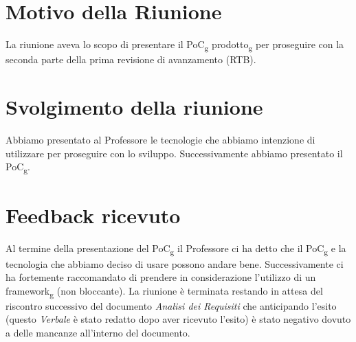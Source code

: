 \section{Motivo della Riunione}
La riunione aveva lo scopo di presentare il PoC\textsubscript{g} prodotto\textsubscript{g} per proseguire con la seconda parte della prima revisione di avanzamento (RTB).
\section{Svolgimento della riunione}
Abbiamo presentato al Professore le tecnologie che abbiamo intenzione di utilizzare per proseguire con lo sviluppo.
Successivamente abbiamo presentato il PoC\textsubscript{g}.
\section{Feedback ricevuto}
Al termine della presentazione del PoC\textsubscript{g} il Professore ci ha detto che il PoC\textsubscript{g} e la tecnologia che abbiamo deciso di usare possono andare bene.
Successivamente ci ha fortemente raccomandato di prendere in considerazione l'utilizzo di un framework\textsubscript{g} (non bloccante).
La riunione è terminata restando in attesa del riscontro successivo del documento \textit{Analisi dei Requisiti} che anticipando
l'esito (questo \textit{Verbale} è stato redatto dopo aver ricevuto l'esito) è stato negativo dovuto 
a delle mancanze all'interno del documento.